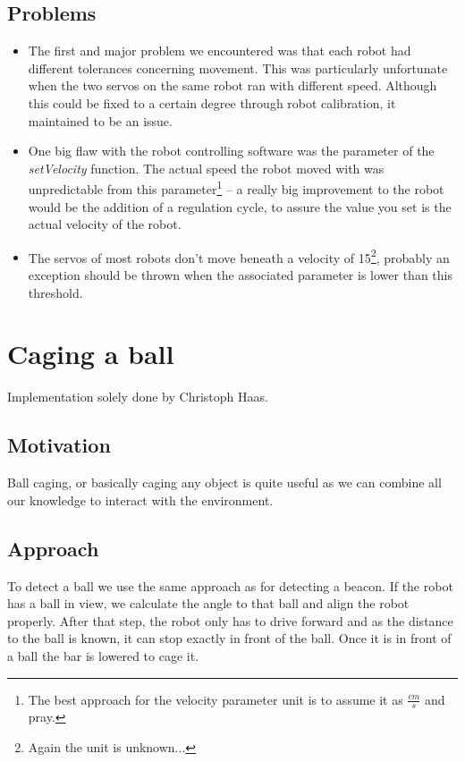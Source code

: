 \documentclass[703031]{iisreport}
\begin{document}
\subsection{Problems}
\label{subsec:motion_problems}
	\begin{itemize}
		\item 	The first and major problem we encountered was that each robot had different tolerances concerning movement. This was particularly unfortunate when the two servos on 
			the same robot ran with different speed. Although this could be fixed to a certain degree through robot calibration, it maintained to be an issue.
		\item	One big flaw with the robot controlling software was the parameter of the \emph{setVelocity} function. The actual speed the robot moved with was unpredictable from
			this parameter\footnote{The best approach for the velocity parameter unit is to assume it as $\frac{cm}{s}$ and pray.} -- a really big improvement to the robot would be the
			addition of a regulation cycle, to assure the value you set is the actual velocity of the robot.
		\item 	The servos of most robots don't move beneath a velocity of 15\footnote{Again the unit is unknown...}, probably an exception should be thrown when the associated parameter is lower than this threshold.
	\end{itemize}


\section{Caging a ball}
\label{sec:caging}
Implementation solely done by Christoph Haas.

\subsection{Motivation}
Ball caging, or basically caging any object is quite useful as we can combine all our knowledge to interact with the environment.

\subsection{Approach}
To detect a ball we use the same approach as for detecting a beacon. If the robot has a ball in view,
we calculate the angle to that ball and align the robot properly. After that step, the robot only has to drive forward and as the distance to the ball is known, it can stop exactly in front of the ball. Once it is in front of a ball the bar is lowered to cage it.
\end{document}
